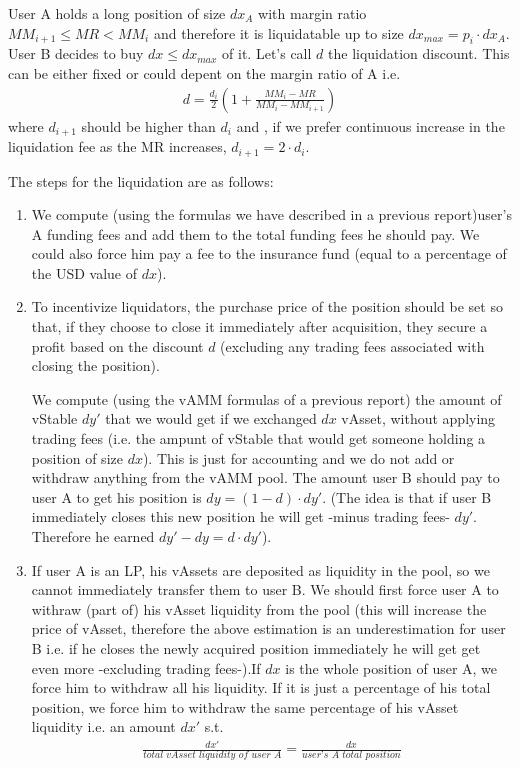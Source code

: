 \documentclass{article}
\begin{document}
User A holds a long position of size $dx_A$ with margin ratio $MM_{i+1}\leq MR < MM_i$ and therefore it is liquidatable up to size $dx_{max}=p_i \cdot dx_A$. User B decides to buy $dx\leq dx_{max}$ of it. Let's call $d$ the liquidation discount. This can be either fixed or could depent on the margin ratio of A i.e. 
\begin{align*}
d=\frac{d_i}{2} \left( 1+ \frac{MM_i -MR}{MM_i-MM_{i+1}} \right)
\end{align*}
where $d_{i+1}$ should be higher than $d_i$ and , if we prefer continuous increase in the liquidation fee as the MR increases, $d_{i+1}=2\cdot d_i$.

The steps for the liquidation are as follows:
\begin{enumerate}
\item   We compute (using the formulas we have described in a previous report)user's A funding fees and add them to the total funding fees he should pay. We could also force him pay a fee to the  insurance fund (equal to a percentage of the USD value of $dx$).

\item To incentivize liquidators, the purchase price of the position should be set so that, if they choose to close it immediately after acquisition, they secure a profit based on the discount $d$ (excluding any trading fees associated with closing the position). 
   
We compute (using the vAMM formulas of a previous report) the amount of vStable $dy'$ that we would get if we exchanged $dx$ vAsset, without applying trading fees (i.e. the ampunt of vStable that would get someone holding a position of size $dx$). This is just for accounting and we do not add or withdraw anything from the vAMM pool. The amount user B should pay to user A to get his position is $dy=(1-d)\cdot dy'$. (The idea is that if user B immediately closes this new position he will get -minus trading fees- $dy'$. Therefore he earned $dy'-dy = d\cdot dy'$).

\item  If user A is an LP, his vAssets are deposited as liquidity in the pool, so we cannot immediately transfer them to user B. We should first force user A to withraw (part of) his vAsset liquidity from the pool (this will increase the price of vAsset, therefore the above estimation is an underestimation for user B i.e. if he closes the newly acquired position immediately he will get get even more -excluding trading fees-).If $dx$ is the whole position of user A, we force him to withdraw all his liquidity. If it is just a percentage of his total position, we force him to withdraw the same percentage of his vAsset liquidity i.e. an amount $dx'$ s.t. 
\begin{align*}
\frac{dx'}{\textit{total vAsset liquidity of user A}}=\frac{dx}{\textit{user's A total position}}
\end{align*}


\end{enumerate}
\end{document}
